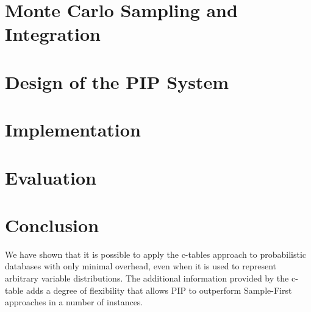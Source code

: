 \documentclass{vldb}
\begin{document}
\section{Monte Carlo Sampling and Integration}
\label{sec:sampling}


\section{Design of the PIP System}
\label{sec:design}


\section{Implementation}
\label{sec:implementation}


\section{Evaluation}
\label{sec:evaluation}



\section{Conclusion}

We have shown that it is possible to apply the c-tables approach to probabilistic databases with only minimal overhead, even when it is used to represent arbitrary variable distributions.  The additional information provided by the c-table adds a degree of flexibility that allows PIP to outperform Sample-First approaches in a number of instances.

\begin{small}


\end{small}
\end{document}
